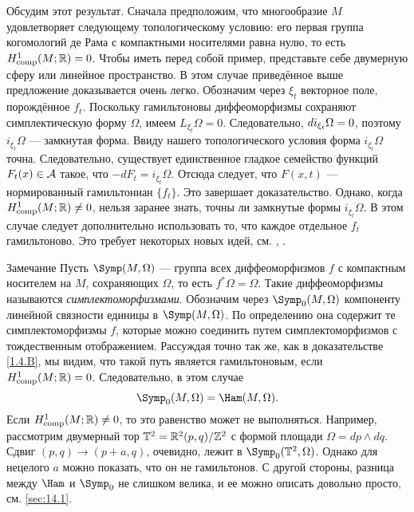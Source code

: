 Обсудим этот результат.
Сначала предположим, что многообразие $M$ удовлетворяет следующему
топологическому условию: его первая группа когомологий де Рама с компактными носителями равна нулю, то есть $H_{\mathrm{comp}}^1(M;\mathbb{R}) = 0$.
Чтобы иметь перед собой пример, представьте себе двумерную сферу или линейное пространство.
В этом случае приведённое выше предложение доказывается очень легко.
Обозначим через $\xi_t$ векторное поле, порождённое $f_t$.
Поскольку гамильтоновы диффеоморфизмы сохраняют симплектическую форму $\Omega$, имеем $L_{\xi_t} \Omega = 0$.
Следовательно, $d i_{\xi_t} \Omega = 0$, поэтому $i_{\xi_t} \Omega$ — замкнутая форма.
Ввиду нашего топологического условия форма $i_{\xi_t} \Omega$ точна.
Следовательно, существует единственное гладкое семейство функций $F_t (x) \in \mathcal{A}$ такое, что $-dF_t = i_{\xi_t} \Omega$.
Отсюда следует, что $F (x, t)$ — нормированный гамильтониан $\{f_t\}$.
Это завершает доказательство.
Однако, когда $H^1_{\mathrm{comp}} (M;\mathbb{R}) \ne 0$, нельзя  заранее знать, точны ли замкнутые формы $i_{\xi_t} \Omega$.
В этом случае следует дополнительно использовать то, что каждое отдельное $f_t$ гамильтоново.
Это требует некоторых новых идей, см. \cite{B1}, \cite{MS}.

{\sloppy 

\begin{ex}{Замечание}\label{1.4.C}
Пусть $\Symp(M,\Omega)$ — группа всех диффеоморфизмов $f$ с компактным носителем на $M$, сохраняющих $\Omega$, то есть $f^\ast\Omega = \Omega$.
Такие диффеоморфизмы называются \emph{симплектоморфизмами}.
Обозначим через $\Symp_0(M,\Omega)$ компоненту линейной связности единицы в $\Symp(M,\Omega)$.
По определению она содержит те симплектоморфизмы $f$, которые можно соединить путем симплектоморфизмов с тождественным отображением.
Рассуждая точно так же, как в доказательстве \ref{1.4.B}, мы видим, что такой путь является гамильтоновым, если $H^1_{\mathrm{comp}} (M;\mathbb{R}) = 0$.
Следовательно, в этом случае
\[\Symp_0 (M, \Omega) = \Ham (M, \Omega).\]
Если $H^1_{\mathrm{comp}} (M;\mathbb{R}) \ne 0$, то это равенство может не выполняться.
Например, рассмотрим двумерный тор $\mathbb{T}^2=\mathbb{R}^2(p,q)/\mathbb{Z}^2$ с формой площади $\Omega = dp \wedge dq$.
Сдвиг $(p, q) \to (p + a, q)$, очевидно, лежит в $\Symp_0 (\TT^2, \Omega)$.
Однако для нецелого $a$ можно показать, что он не гамильтонов.
С другой стороны, разница между $\Ham$ и $\Symp_0$ не слишком велика, и ее можно описать довольно просто, см. \ref{sec:14.1}.
\end{ex}

}

